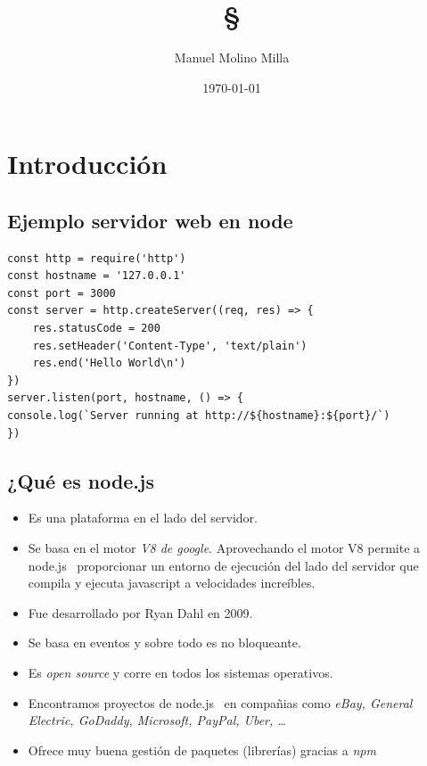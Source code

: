 \documentclass[4paper]{article}
\author{Manuel Molino Milla}
\title{\textbf{\S}}
\date{\today}
\newcommand{\N}{node.js}
\begin{document}
\maketitle 
\tableofcontents
\newpage

\section{Introducción}
\subsection{Ejemplo servidor web en node}
\begin{lstlisting}
const http = require('http')
const hostname = '127.0.0.1'
const port = 3000
const server = http.createServer((req, res) => {
    res.statusCode = 200
    res.setHeader('Content-Type', 'text/plain')
    res.end('Hello World\n')
})
server.listen(port, hostname, () => {
console.log(`Server running at http://${hostname}:${port}/`)
})
\end{lstlisting}
\subsection{¿Qué es \N}
\begin{itemize}
\item Es una plataforma en el lado del servidor.
\item Se basa en el motor \emph{V8 de google}. Aprovechando el motor V8 permite a \N ~ proporcionar un entorno de ejecución del lado del servidor que compila y ejecuta javascript a velocidades increíbles.
\item Fue desarrollado por Ryan Dahl en 2009.
\item Se basa en eventos y sobre todo es no bloqueante.
\item Es \emph{open source} y corre en todos los sistemas operativos.
\item Encontramos proyectos de \N ~ en compañias como \emph{eBay, General Electric, GoDaddy, Microsoft, PayPal, Uber, \dots}
\item Ofrece muy buena gestión de paquetes (librerías) gracias a \emph{npm}
\end{itemize}
\end{document}
